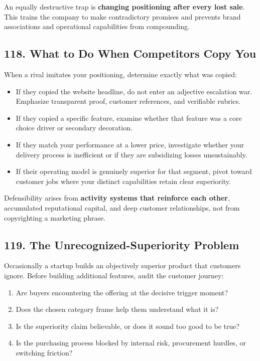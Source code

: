 An equally destructive trap is \textbf{changing positioning after every lost sale}. This trains the company to make contradictory promises and prevents brand associations and operational capabilities from compounding.

\subsection*{118. What to Do When Competitors Copy You}

When a rival imitates your positioning, determine exactly what was copied:
\begin{itemize}
    \item If they copied the website headline, do not enter an adjective escalation war. Emphasize transparent proof, customer references, and verifiable rubrics.
    \item If they copied a specific feature, examine whether that feature was a core choice driver or secondary decoration.
    \item If they match your performance at a lower price, investigate whether your delivery process is inefficient or if they are subsidizing losses unsustainably.
    \item If their operating model is genuinely superior for that segment, pivot toward customer jobs where your distinct capabilities retain clear superiority.
\end{itemize}

Defensibility arises from \textbf{activity systems that reinforce each other}, accumulated reputational capital, and deep customer relationships, not from copyrighting a marketing phrase.

\subsection*{119. The Unrecognized-Superiority Problem}

Occasionally a startup builds an objectively superior product that customers ignore. Before building additional features, audit the customer journey:
\begin{enumerate}
    \item Are buyers encountering the offering at the decisive trigger moment?
    \item Does the chosen category frame help them understand what it is?
    \item Is the superiority claim believable, or does it sound too good to be true?
    \item Is the purchasing process blocked by internal risk, procurement hurdles, or switching friction?
\end{enumerate}

